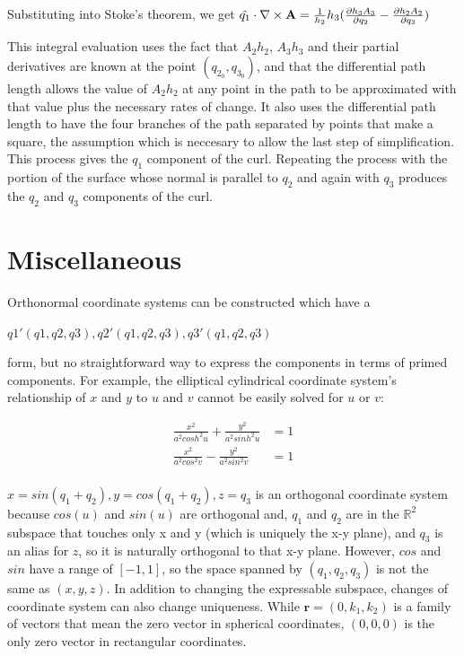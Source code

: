 \documentclass{article}
\begin{document}
Substituting into Stoke's theorem, we get $\hat{q_1} \cdot \nabla \times \textbf{A} = \frac{1}{h_2}{h_3} (\frac{\partial{h_3 A_3}}{\partial{q_2}} - \frac{\partial{h_2 A_2}}{\partial{q_3}}) $

This integral evaluation uses the fact that $A_2 h_2$, $A_3 h_3$ and their partial derivatives are known at the point $(q_{2_0}, q_{3_0})$, and that the differential path length allows the value of $A_2 h_2$ at any point in the path to be approximated with that value plus the necessary rates of change. It also uses the differential path length to have the four branches of the path separated by points that make a square, the assumption which is neccesary to allow the last step of simplification. This process gives the $q_1$ component of the curl. Repeating the process with the portion of the surface whose normal is parallel to $q_2$ and again with $q_3$ produces the $q_2$ and $q_3$ components of the curl.

\section*{Miscellaneous}

Orthonormal coordinate systems can be constructed which have a

$q1'(q1,q2,q3), q2'(q1,q2,q3), q3'(q1,q2,q3) $

form, but no straightforward way to express the components in terms of primed components. For example, the elliptical cylindrical coordinate system's relationship of $x$ and $y$ to $u$ and $v$ cannot be easily solved for $u$ or $v$:

\begin{align*}
\frac{x^2}{a^2 cosh^2 u} + \frac{y^2}{a^2 sinh^2 u} &= 1 \\
\frac{x^2}{a^2 cos^2 v} - \frac{y^2}{a^2 sin^2 v} &= 1 \\
\end{align*}

$x = sin(q_1 + q_2), y = cos(q_1 + q_2), z = q_3$ is an orthogonal coordinate system because $cos(u)$ and $sin(u)$ are orthogonal and, $q_1$ and $q_2$ are in the $\mathbb{R}^2$ subspace that touches only x and y (which is uniquely the x-y plane), and $q_3$ is an alias for $z$, so it is naturally orthogonal to that x-y plane. However, $cos$ and $sin$ have a range of $[-1,1]$, so the space spanned by $(q_1,q_2,q_3)$ is not the same as $(x,y,z)$. In addition to changing the expressable subspace, changes of coordinate system can also change uniqueness. While $\textbf{r} = (0, k_1, k_2)$ is a family of vectors that mean the zero vector in spherical coordinates, $(0,0,0)$ is the only zero vector in rectangular coordinates.

\printbibliography
\end{document}
